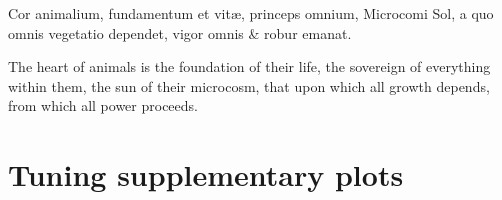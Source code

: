 \begin{savequote}[8cm]
\textlatin{Cor animalium, fundamentum e\longs t vitæ, princeps omnium, Microco\longs mi Sol, a quo omnis vegetatio dependet, vigor omnis \& robur emanat.}

The heart of animals is the foundation of their life, the sovereign of everything within them, the sun of their microcosm, that upon which all growth depends, from which all power proceeds.
\end{savequote}

\chapter{\label{app:tuning}Tuning supplementary plots}

\minitoc



